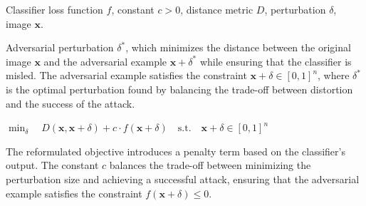 
Classifier loss function $f$, constant $c > 0$, distance metric $D$, perturbation $\delta$, image $\mathbf{x}$.

Adversarial perturbation $\delta^*$, which minimizes the distance between the original image $\mathbf{x}$ and the adversarial example $\mathbf{x} + \delta^*$ while ensuring that the classifier is misled. The adversarial example satisfies the constraint $\mathbf{x} + \delta \in [0, 1]^n$, where $\delta^*$ is the optimal perturbation found by balancing the trade-off between distortion and the success of the attack.

$\min_{\delta} \quad D(\mathbf{x}, \mathbf{x} + \delta) + c \cdot f(\mathbf{x} + \delta) \quad \text{s.t.} \quad \mathbf{x} + \delta \in [0, 1]^n$

The reformulated objective introduces a penalty term based on the classifier’s output. The constant $c$ balances the trade-off between minimizing the perturbation size and achieving a successful attack, ensuring that the adversarial example satisfies the constraint $f(\mathbf{x} + \delta) \leq 0$.